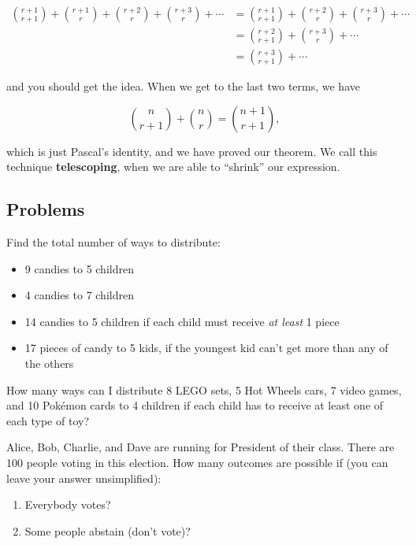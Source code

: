 \begin{align*}
    \binom{r+1}{r+1}+\binom{r+1}{r}+\binom{r+2}{r}+\binom{r+3}{r}+\cdots&=\binom{r+1}{r+1}+\binom{r+2}{r}+\binom{r+3}{r}+\cdots \\
        &=\binom{r+2}{r+1}+\binom{r+3}{r}+\cdots \\
        &=\binom{r+3}{r+1}+\cdots
\end{align*}

and you should get the idea. When we get to the last two terms, we have 

$$\binom{n}{r+1}+\binom{n}{r}=\binom{n+1}{r+1},$$

which is just Pascal's identity, and we have proved our theorem. We call this technique \textbf{telescoping}, when we are able to ``shrink'' our expression.

\clearpage

\subsection{Problems}
\begin{problem}
Find the total number of ways to distribute:
\begin{itemize}
    \item 9 candies to 5 children
    \item 4 candies to 7 children
    \item 14 candies to 5 children if each child must receive \textit{at least} 1 piece
    \item 17 pieces of candy to 5 kids, if the youngest kid can't get more than any of the others
\end{itemize}
\end{problem}

\begin{problem}
How many ways can I distribute 8 LEGO sets, 5 Hot Wheels cars, 7 video games, and 10 Pok\'{e}mon cards to 4 children if each child has to receive at least one of each type of toy?
\end{problem}

\begin{problem}
Alice, Bob, Charlie, and Dave are running for President of their class. There are 100 people voting in this election. How many outcomes are possible if (you can leave your answer unsimplified):
\begin{enumerate}[label=(\alph*)]
    \item Everybody votes?
    \item Some people abstain (don't vote)?
\end{enumerate}
\end{problem}

